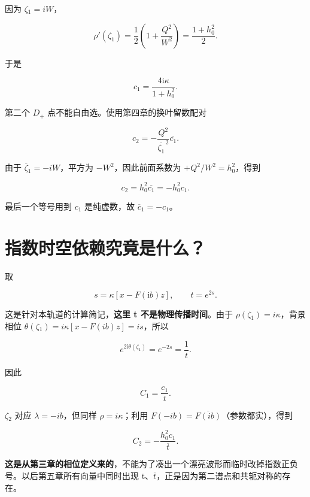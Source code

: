 因为 $\zeta{}_{1}=iW$，\par

\[
\rho'(\zeta_1)=\dfrac{1}{2}
\left(1+\dfrac{Q^2}{W^2}\right)
=\dfrac{1+h_0^2}{2}.
\]

于是\par

\[
\boxed{c_1=\dfrac{4\mathrm{i}\kappa}{1+h_0^2}.}
\]

第二个 $D_{+}$ 点不能自由选。使用第四章的换叶留数配对\par

\[
c_2=-\dfrac{Q^2}{\overline{\zeta_1}^{\,2}}\overline{c_1}.
\]

由于 $\overline \zeta{}_{1}=-iW$，平方为 $-W^{2}$，因此前面系数为 $+Q^{2}/W^{2}=h_{0}^{2}$，得到\par

\[
c_2=h_0^2\overline{c_1}=-h_0^2c_1.
\]

最后一个等号用到 $c_{1}$ 是纯虚数，故 $\overline c_{1}=-c_{1}$。\par

\section{指数时空依赖究竟是什么？}
\par

取\par

\[
s=\kappa[x-F(\mathrm{i}b)z],\qquad t=e^{2s}.
\]

这是针对本轨道的计算简记，\textbf{这里 t 不是物理传播时间}。由于 $\rho(\zeta{}_{1})=i\kappa{}$，背景相位 $\theta{}(\zeta{}_{1})=i\kappa{}[x-F(ib)z]=is$，所以\par

\[
e^{2\mathrm{i}\theta(\zeta_1)}=e^{-2s}=\dfrac{1}{t}.
\]

因此\par

\[
C_1=\dfrac{c_1}{t}.
\]

$\zeta{}_{2}$ 对应 $\lambda{}=-ib$，但同样 $\rho{}=i\kappa{}$；利用 $F(-ib)=\overline{F(ib)}$（参数都实），得到\par

\[
C_2=-\dfrac{h_0^2c_1}{\overline t}.
\]

\textbf{这是从第三章的相位定义来的}，不能为了凑出一个漂亮波形而临时改掉指数正负号。以后第五章所有向量中同时出现 t、$\overline t$，正是因为第二谱点和共轭对称的存在。\par

